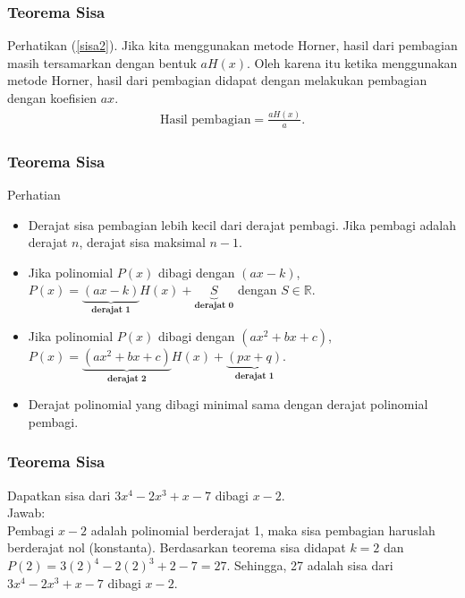 \documentclass[11pt]{beamer}
\begin{document}
	\begin{frame}
		\frametitle{Teorema Sisa}
		Perhatikan (\ref{sisa2}). Jika kita menggunakan metode Horner, hasil dari pembagian masih tersamarkan dengan bentuk $aH(x)$. Oleh karena itu ketika menggunakan metode Horner, hasil dari pembagian didapat dengan melakukan pembagian dengan koefisien $ax$.\\
		\begin{align*}
			\text{Hasil pembagian}=\frac{aH(x)}{a}.
		\end{align*}
				
	\end{frame}	
	
	\begin{frame}
		\frametitle{Teorema Sisa}
		\begin{block}{Perhatian}
			\begin{itemize}
				\item Derajat sisa pembagian lebih kecil dari derajat pembagi. Jika pembagi adalah derajat $n$, derajat sisa maksimal $n-1$.
				\item Jika polinomial $P(x)$ dibagi dengan $(ax-k)$, $P(x)=\underbrace{(ax-k)}_{\textbf{derajat 1}}H(x)+\underbrace{S}_{\textbf{derajat 0}}$ dengan $S\in \mathbb{R}$.
				\item Jika polinomial $P(x)$ dibagi dengan $(ax^2+bx+c)$, $P(x)=\underbrace{(ax^2+bx+c)}_{\textbf{derajat 2}}H(x)+\underbrace{(px+q)}_{\textbf{derajat 1}}$.
				\item Derajat polinomial yang dibagi minimal sama dengan derajat polinomial pembagi.
			\end{itemize}
		\end{block}
		 
	\end{frame}
		
	\begin{frame}
		\frametitle{Teorema Sisa}
		Dapatkan sisa dari $3x^4-2x^3+x-7$ dibagi $x-2$.\\ Jawab:\\
		Pembagi $x-2$ adalah polinomial berderajat 1, maka sisa pembagian haruslah berderajat nol (konstanta). Berdasarkan teorema sisa didapat $k=2$ dan $P(2)=3(2)^4-2(2)^3+2-7=27$. Sehingga, 27 adalah sisa dari $3x^4-2x^3+x-7$ dibagi $x-2$.
	\end{frame}	
	
\end{document}
